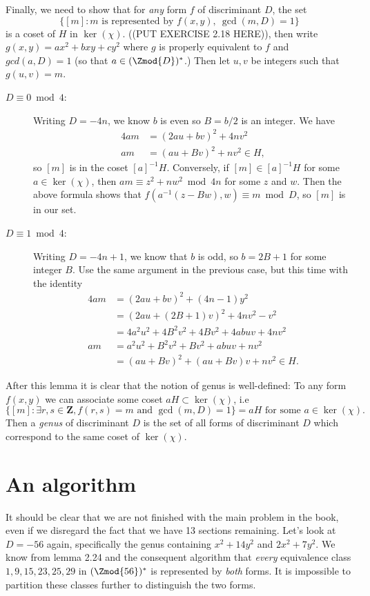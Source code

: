 Finally, we need to show that for \emph{any} form $f$ of discriminant $D$, the set
\[\{[m]: m\text{ is represented by }f(x,y),\ \gcd(m, D)=1\}\]
is a coset of $H$ in $\ker(\chi)$. ((PUT EXERCISE 2.18 HERE)), then write $g(x,y)=ax^2+bxy+cy^2$ where $g$ is properly equivalent to $f$ and $gcd(a,D)=1$ (so that $a\in(\Zmod{D})^*$.) Then let $u,v$ be integers such that $g(u,v)=m$.
\begin{description}
  \item [$D\equiv 0\bmod 4$:]
  Writing $D=-4n$, we know $b$ is even so $B=b/2$ is an integer. We have
  \begin{align*}
    4am&=(2au+bv)^2+4nv^2\\
     am&=(au+Bv)^2+nv^2\in H,
  \end{align*}
  so $[m]$ is in the coset $[a]^{-1}H$. Conversely, if $[m]\in[a]^{-1}H$ for some $a\in\ker(\chi)$, then $am\equiv z^2+nw^2\bmod 4n$ for some $z$ and $w$. Then the above formula shows that $f(a^{-1}(z-Bw), w)\equiv m\bmod D$, so $[m]$ is in our set.

  \item [$D\equiv 1\bmod 4$:]
  Writing $D=-4n+1$, we know that $b$ is odd, so $b=2B+1$ for some integer $B$. Use the same argument in the previous case, but this time with the identity
  \begin{align*}
    4am&=(2au+bv)^2+(4n-1)y^2\\
       &=(2au+(2B+1)v)^2+4nv^2-v^2\\
       &=4a^2u^2+4B^2v^2+4Bv^2+4abuv+4nv^2\\
     am&=a^2u^2+B^2v^2+Bv^2+abuv+nv^2\\
       &=(au+Bv)^2+(au+Bv)v+nv^2\in H.
  \end{align*}
\end{description}

After this lemma it is clear that the notion of genus is well-defined: To any form $f(x,y)$ we can associate some coset $aH\subset\ker(\chi)$, i.e
\[\{[m]:\exists r,s\in\mathbf{Z}, f(r,s)=m\text{ and }\gcd(m,D)=1\}=aH\text{ for some }a\in\ker(\chi).\]
Then a \emph{genus} of discriminant $D$ is the set of all forms of discriminant $D$ which correspond to the same coset of $\ker(\chi)$.

\section{An algorithm}


It should be clear that we are not finished with the main problem in the book, even if we disregard the fact that we have 13 sections remaining. Let's look at $D=-56$ again, specifically the genus containing $x^2+14y^2$ and $2x^2+7y^2$. We know from lemma 2.24 and the consequent algorithm that \emph{every} equivalence class $1, 9, 15, 23, 25, 29$ in $(\Zmod{56})^*$ is represented by \emph{both} forms. It is impossible to partition these classes further to distinguish the two forms.

